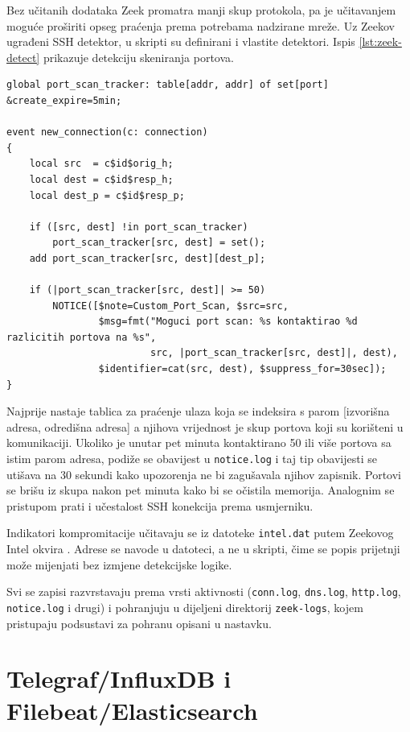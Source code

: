 Bez učitanih dodataka Zeek promatra manji skup protokola, pa je učitavanjem moguće proširiti opseg praćenja prema potrebama nadzirane mreže.
Uz Zeekov ugrađeni SSH  detektor, u skripti su definirani i vlastite detektori. Ispis \ref{lst:zeek-detect} prikazuje detekciju skeniranja
portova. 

\begin{lstlisting}[caption={Detekcija skeniranja portova u \texttt{local.zeek}}, label={lst:zeek-detect}]
global port_scan_tracker: table[addr, addr] of set[port] &create_expire=5min;

event new_connection(c: connection)
{
    local src  = c$id$orig_h;
    local dest = c$id$resp_h;
    local dest_p = c$id$resp_p;

    if ([src, dest] !in port_scan_tracker)
        port_scan_tracker[src, dest] = set();
    add port_scan_tracker[src, dest][dest_p];

    if (|port_scan_tracker[src, dest]| >= 50)
        NOTICE([$note=Custom_Port_Scan, $src=src,
                $msg=fmt("Moguci port scan: %s kontaktirao %d razlicitih portova na %s",
                         src, |port_scan_tracker[src, dest]|, dest),
                $identifier=cat(src, dest), $suppress_for=30sec]);
}
\end{lstlisting}

Najprije nastaje tablica za praćenje ulaza koja se indeksira s parom [izvorišna adresa, odredišna adresa] a njihova vrijednost je skup portova koji su korišteni u komunikaciji.
Ukoliko je unutar pet minuta kontaktirano 50 ili više portova sa istim parom adresa, podiže se obavijest u \texttt{notice.log} i taj tip obavijesti se utišava na 30 sekundi kako upozorenja
ne bi zagušavala njihov zapisnik. Portovi se brišu iz skupa nakon pet minuta kako bi se očistila memorija. Analognim se pristupom prati i učestalost SSH konekcija prema usmjerniku.

Indikatori kompromitacije  učitavaju se iz datoteke \texttt{intel.dat} putem Zeekovog Intel okvira \cite{zeek_docs}. Adrese se navode u datoteci, a
ne u skripti, čime se popis prijetnji može mijenjati bez izmjene detekcijske logike. 

Svi se zapisi razvrstavaju prema vrsti aktivnosti (\texttt{conn.log}, \texttt{dns.log},
\texttt{http.log}, \texttt{notice.log} i drugi) i pohranjuju u dijeljeni direktorij \texttt{zeek-logs}, kojem pristupaju podsustavi za pohranu opisani u nastavku.

\section{Telegraf/InfluxDB i Filebeat/Elasticsearch}

